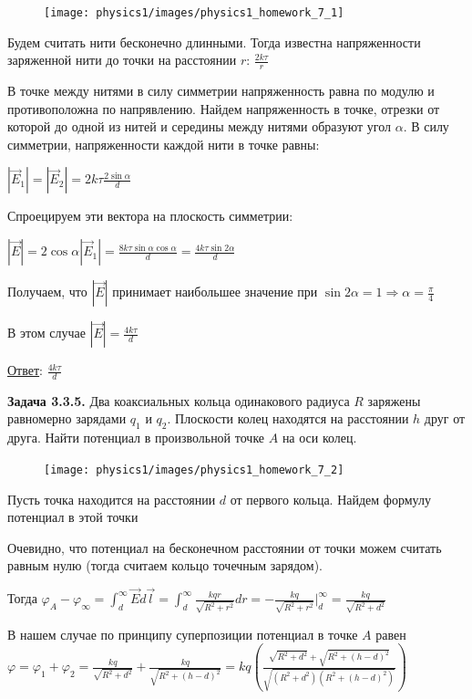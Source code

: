 \documentclass[12pt]{article}
\begin{document}
\begin{minipage}{\textwidth}
    \begin{figure}
        \texttt{[image: physics1/images/physics1\_homework\_7\_1]}
    \end{figure}

    Будем считать нити бесконечно длинными. Тогда известна напряженности заряженной нити до точки на расстоянии $r$: $\frac{2k\tau}{r}$

    В точке между нитями в силу симметрии напряженность равна по модулю и противоположна по напрявлению. Найдем напряженность в точке,
    отрезки от которой до одной из нитей и середины между нитями образуют угол $\alpha$. В силу симметрии, напряженности
    каждой нити в точке равны:

    $|\vec{E}_1| = |\vec{E}_2| = 2k\tau \frac{2\sin\alpha}{d}$

    Спроецируем эти вектора на плоскость симметрии:

    $|\vec{E}| = 2\cos\alpha |\vec{E}_1| = \frac{8k\tau \sin\alpha\cos\alpha}{d} = \frac{4k\tau \sin2\alpha}{d}$

    Получаем, что $|\vec{E}|$ принимает наибольшее значение при $\sin2\alpha = 1 \Longrightarrow \alpha = \frac{\pi}{4}$

    В этом случае $|\vec{E}| = \frac{4k\tau}{d}$
\end{minipage}

\bigvspace

\underline{Ответ}: $\frac{4k\tau}{d}$

\clearpage

\begin{tcolorbox}
    \textbf{Задача 3.3.5.} Два коаксиальных кольца одинакового радиуса $R$
    заряжены равномерно зарядами $q_1$ и $q_2$. Плоскости колец находятся
    на расстоянии $h$ друг от друга. Найти потенциал в произвольной
    точке $A$ на оси колец.
\end{tcolorbox}

\begin{minipage}{\textwidth}
    \begin{figure}
        \texttt{[image: physics1/images/physics1\_homework\_7\_2]}
    \end{figure}

    Пусть точка находится на расстоянии $d$ от первого кольца. Найдем формулу потенциал в этой точки

    Очевидно, что потенциал на бесконечном расстоянии от точки можем считать равным нулю (тогда считаем кольцо точечным зарядом). 

    Тогда $\varphi_A - \varphi_\infty = \int_{d}^{\infty} \vec{E}d\vec{l} = \int_{d}^{\infty} \frac{kqr}{\sqrt{R^2 + r^2}} dr = 
    -\frac{kq}{\sqrt{R^2 + r^2}} \Big|_{d}^{\infty} = \frac{kq}{\sqrt{R^2 + d^2}}$

    В нашем случае по принципу суперпозиции потенциал в точке $A$ равен $\varphi = \varphi_1 + \varphi_2 = 
    \frac{kq}{\sqrt{R^2 + d^2}} + \frac{kq}{\sqrt{R^2 + (h - d)^2}} = 
    kq\left(\frac{\sqrt{R^2 + d^2} + \sqrt{R^2 + (h - d)^2}}{\sqrt{(R^2 + d^2)(R^2 + (h - d)^2)}}\right)$
\end{minipage}
\end{document}
